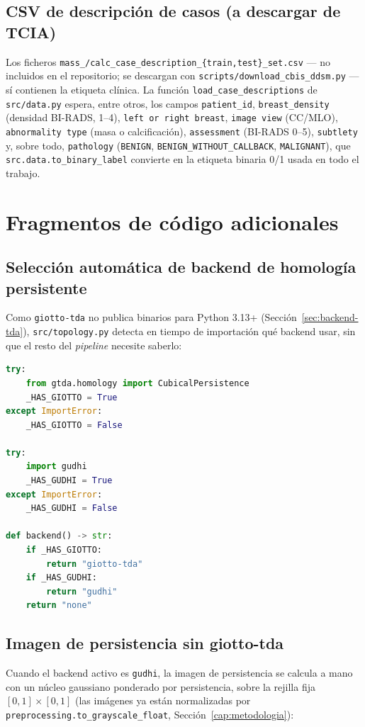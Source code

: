 \subsection{CSV de descripción de casos (a descargar de TCIA)}
Los ficheros \texttt{mass\_/calc\_case\_description\_\{train,test\}\_set.csv}
--- no incluidos en el repositorio; se descargan con \texttt{scripts/download\_cbis\_ddsm.py}
--- sí contienen la etiqueta clínica. La función
\texttt{load\_case\_descriptions} de \texttt{src/data.py} espera, entre otros,
los campos \texttt{patient\_id}, \texttt{breast\_density}
(densidad BI-RADS, 1--4), \texttt{left or right breast}, \texttt{image view}
(CC/MLO), \texttt{abnormality type} (masa o calcificación), \texttt{assessment}
(BI-RADS 0--5), \texttt{subtlety} y, sobre todo, \texttt{pathology}
(\texttt{BENIGN}, \texttt{BENIGN\_WITHOUT\_CALLBACK}, \texttt{MALIGNANT}), que
\texttt{src.data.to\_binary\_label} convierte en la etiqueta binaria 0/1 usada
en todo el trabajo.

\section{Fragmentos de código adicionales}

\subsection{Selección automática de backend de homología persistente}
Como \texttt{giotto-tda} no publica binarios para Python 3.13+
(Sección~\ref{sec:backend-tda}), \texttt{src/topology.py} detecta en tiempo de
importación qué backend usar, sin que el resto del \textit{pipeline} necesite
saberlo:

\begin{lstlisting}[language=Python, caption={Deteccion de backend en src/topology.py (fragmento).}, label={lst:backend-detection}]
try:
    from gtda.homology import CubicalPersistence
    _HAS_GIOTTO = True
except ImportError:
    _HAS_GIOTTO = False

try:
    import gudhi
    _HAS_GUDHI = True
except ImportError:
    _HAS_GUDHI = False

def backend() -> str:
    if _HAS_GIOTTO:
        return "giotto-tda"
    if _HAS_GUDHI:
        return "gudhi"
    return "none"
\end{lstlisting}

\subsection{Imagen de persistencia sin giotto-tda}
Cuando el backend activo es \texttt{gudhi}, la imagen de persistencia se
calcula a mano con un núcleo gaussiano ponderado por persistencia, sobre la
rejilla fija $[0,1]\times[0,1]$ (las imágenes ya están normalizadas por
\texttt{preprocessing.to\_grayscale\_float}, Sección~\ref{cap:metodologia}):

